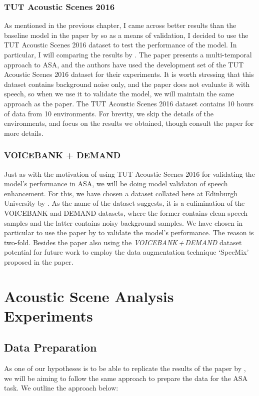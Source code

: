 \documentclass[logo,bsc,singlespacing,parskip,online]{infthesis}
\newcommand{\vbd}{\textit{VOICEBANK\,+\,DEMAND}\xspace}
\begin{document}
\subsection{TUT Acoustic Scenes 2016}
As mentioned in the previous chapter, I came across better results than the baseline model in the paper by \citet{Huwel2020HearDS} 
so as a means of validation, I decided to use the TUT Acoustic Scenes 2016 dataset \citep{mesaros_tut_2016} to test the performance of the model.
In particular, I will comparing the results by \citet{schindler_multi-temporal_2018}. The paper presents a multi-temporal approach to ASA, and 
the authors have used the development set of the TUT Acoustic Scenes 2016 dataset for their experiments. It is worth stressing 
that this dataset contains background noise only, and the paper does not evaluate it with speech, so when we use it to validate 
the model, we will maintain the same approach as the paper.
The TUT Acoustic Scenes 2016 dataset contains 10 hours of data from 10 environments.
For brevity, we skip the details of the environments, and focus on the results we obtained, though consult the paper for more details.

\subsection{VOICEBANK + DEMAND}
Just as with the motivation of using TUT Acoustic Scenes 2016 for validating the model's performance in ASA,
we will be doing model validaton of speech enhancement. 
For this, we have chosen a dataset collated here at Edinburgh University by \citet{valentini-botinhao_speech_2016}. 
As the name of the dataset suggests, it is a culimination of the VOICEBANK \citep{voicebank} and DEMAND \citep{demand} datasets, 
where the former contains clean speech samples and the latter contains noisy background samples.
We have chosen in particular to use the paper by \citet{kim_specmix_2021} to validate the model's performance.
The reason is two-fold. Besides the paper also using the \vbd dataset
potential for future work to employ the data augmentation technique `SpecMix' proposed in the paper.
\chapter{Acoustic Scene Analysis Experiments}
\label{chap:asa-experiments}
\section{Data Preparation}
\label{sec:data-preparation}
As one of our hypotheses is to be able to replicate the results of the paper by \citet{Huwel2020HearDS}, 
we will be aiming to follow the same approach to prepare the data for the ASA task.
We outline the approach below:
\end{document}
